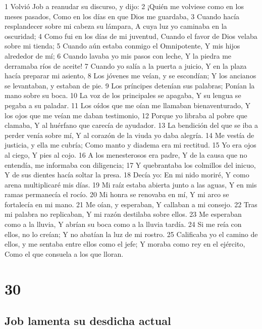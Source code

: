 1 Volvió Job a reanudar su discurso, y dijo:
2 ¡Quién me volviese como en los meses pasados,
Como en los días en que Dios me guardaba,
3 Cuando hacía resplandecer sobre mi cabeza su lámpara,
A cuya luz yo caminaba en la oscuridad;
4 Como fui en los días de mi juventud,
Cuando el favor de Dios velaba sobre mi tienda; 
5 Cuando aún estaba conmigo el Omnipotente,
Y mis hijos alrededor de mí;
6 Cuando lavaba yo mis pasos con leche,
Y la piedra me derramaba ríos de aceite!
7 Cuando yo salía a la puerta a juicio,
Y en la plaza hacía preparar mi asiento,
8 Los jóvenes me veían, y se escondían;
Y los ancianos se levantaban, y estaban de pie.
9 Los príncipes detenían sus palabras;
Ponían la mano sobre su boca. 
10 La voz de los principales se apagaba,
Y su lengua se pegaba a su paladar.
11 Los oídos que me oían me llamaban bienaventurado,
Y los ojos que me veían me daban testimonio,
12 Porque yo libraba al pobre que clamaba,
Y al huérfano que carecía de ayudador.
13 La bendición del que se iba a perder venía sobre mí,
Y al corazón de la viuda yo daba alegría.
14 Me vestía de justicia, y ella me cubría;
Como manto y diadema era mi rectitud. 
15 Yo era ojos al ciego,
Y pies al cojo.
16 A los menesterosos era padre,
Y de la causa que no entendía, me informaba con diligencia;
17 Y quebrantaba los colmillos del inicuo,
Y de sus dientes hacía soltar la presa.
18 Decía yo: En mi nido moriré,
Y como arena multiplicaré mis días.
19 Mi raíz estaba abierta junto a las aguas,
Y en mis ramas permanecía el rocío.
20 Mi honra se renovaba en mí,
Y mi arco se fortalecía en mi mano.
21 Me oían, y esperaban,
Y callaban a mi consejo.
22 Tras mi palabra no replicaban, 
Y mi razón destilaba sobre ellos.
23 Me esperaban como a la lluvia,
Y abrían su boca como a la lluvia tardía.
24 Si me reía con ellos, no lo creían;
Y no abatían la luz de mi rostro.
25 Calificaba yo el camino de ellos, y me sentaba entre ellos como el jefe;
Y moraba como rey en el ejército,
Como el que consuela a los que lloran.

\chapter{30}

\section*{Job lamenta su desdicha actual}

